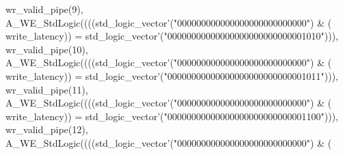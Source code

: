 \begin{DoxyCode}
{      wr_valid_pipe}\textcolor{vhdlchar}{(}\textcolor{vhdllogic}{}\textcolor{vhdllogic}{9}\textcolor{vhdlchar}{)}\textcolor{vhdlchar}{,} \textcolor{vhdlchar}{A\_WE\_StdLogic}\textcolor{vhdlchar}{(}\textcolor{vhdlchar}{(}\textcolor{vhdlchar}{(}\textcolor{vhdlchar}{(}\textcolor{comment}{std\_logic\_vector}\textcolor{vhdlchar}{'}\textcolor{vhdlchar}{(}\textcolor{vhdllogic}{"000000000000000000000000000"}\textcolor{vhdlchar}{)} \textcolor{vhdlchar}{&} \textcolor{vhdlchar}{(}\textcolor{vhdlchar}{
      write_latency}\textcolor{vhdlchar}{)}\textcolor{vhdlchar}{)} \textcolor{vhdlchar}{=} \textcolor{comment}{std\_logic\_vector}\textcolor{vhdlchar}{'}\textcolor{vhdlchar}{(}\textcolor{vhdllogic}{"00000000000000000000000000001010"}\textcolor{vhdlchar}{)}\textcolor{vhdlchar}{)}\textcolor{vhdlchar}{)}\textcolor{vhdlchar}{,} \textcolor{vhdlchar}{
      wr_valid_pipe}\textcolor{vhdlchar}{(}\textcolor{vhdllogic}{}\textcolor{vhdllogic}{10}\textcolor{vhdlchar}{)}\textcolor{vhdlchar}{,} \textcolor{vhdlchar}{A\_WE\_StdLogic}\textcolor{vhdlchar}{(}\textcolor{vhdlchar}{(}\textcolor{vhdlchar}{(}\textcolor{vhdlchar}{(}\textcolor{comment}{std\_logic\_vector}\textcolor{vhdlchar}{'}\textcolor{vhdlchar}{(}\textcolor{vhdllogic}{"000000000000000000000000000"}\textcolor{vhdlchar}{)} \textcolor{vhdlchar}{&} \textcolor{vhdlchar}{(}\textcolor{vhdlchar}{
      write_latency}\textcolor{vhdlchar}{)}\textcolor{vhdlchar}{)} \textcolor{vhdlchar}{=} \textcolor{comment}{std\_logic\_vector}\textcolor{vhdlchar}{'}\textcolor{vhdlchar}{(}\textcolor{vhdllogic}{"00000000000000000000000000001011"}\textcolor{vhdlchar}{)}\textcolor{vhdlchar}{)}\textcolor{vhdlchar}{)}\textcolor{vhdlchar}{,} \textcolor{vhdlchar}{
      wr_valid_pipe}\textcolor{vhdlchar}{(}\textcolor{vhdllogic}{}\textcolor{vhdllogic}{11}\textcolor{vhdlchar}{)}\textcolor{vhdlchar}{,} \textcolor{vhdlchar}{A\_WE\_StdLogic}\textcolor{vhdlchar}{(}\textcolor{vhdlchar}{(}\textcolor{vhdlchar}{(}\textcolor{vhdlchar}{(}\textcolor{comment}{std\_logic\_vector}\textcolor{vhdlchar}{'}\textcolor{vhdlchar}{(}\textcolor{vhdllogic}{"000000000000000000000000000"}\textcolor{vhdlchar}{)} \textcolor{vhdlchar}{&} \textcolor{vhdlchar}{(}\textcolor{vhdlchar}{
      write_latency}\textcolor{vhdlchar}{)}\textcolor{vhdlchar}{)} \textcolor{vhdlchar}{=} \textcolor{comment}{std\_logic\_vector}\textcolor{vhdlchar}{'}\textcolor{vhdlchar}{(}\textcolor{vhdllogic}{"00000000000000000000000000001100"}\textcolor{vhdlchar}{)}\textcolor{vhdlchar}{)}\textcolor{vhdlchar}{)}\textcolor{vhdlchar}{,} \textcolor{vhdlchar}{
      wr_valid_pipe}\textcolor{vhdlchar}{(}\textcolor{vhdllogic}{}\textcolor{vhdllogic}{12}\textcolor{vhdlchar}{)}\textcolor{vhdlchar}{,} \textcolor{vhdlchar}{A\_WE\_StdLogic}\textcolor{vhdlchar}{(}\textcolor{vhdlchar}{(}\textcolor{vhdlchar}{(}\textcolor{vhdlchar}{(}\textcolor{comment}{std\_logic\_vector}\textcolor{vhdlchar}{'}\textcolor{vhdlchar}{(}\textcolor{vhdllogic}{"000000000000000000000000000"}\textcolor{vhdlchar}{)} \textcolor{vhdlchar}{&} \textcolor{vhdlchar}{(}\textcolor{vhdlchar}{
}
\end{DoxyCode}
